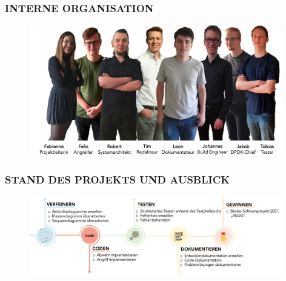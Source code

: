 \documentclass{beamer}
\begin{document}


\begin{frame}
    \frametitle{INTERNE ORGANISATION}
    \begin{figure}[ht]
        \centering
        \includegraphics[width=11cm]{img/team_neu.png}
    \end{figure}
\end{frame}

\begin{frame}
    \frametitle{STAND DES PROJEKTS UND AUSBLICK}
    \begin{figure}[ht]
        \centering
        \includegraphics[width=11cm]{img/ausblick.png}
    \end{figure}
\end{frame}
\end{document}
